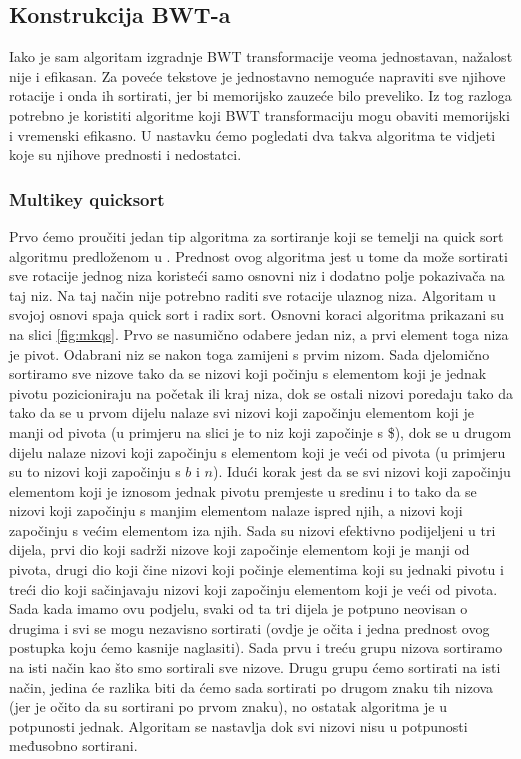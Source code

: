 \subsection{Konstrukcija BWT-a}
Iako je sam algoritam izgradnje BWT transformacije veoma jednostavan, nažalost nije i efikasan. Za poveće tekstove je jednostavno nemoguće napraviti sve njihove rotacije i onda ih sortirati, jer bi memorijsko zauzeće bilo preveliko. Iz tog razloga potrebno je koristiti algoritme koji BWT transformaciju mogu obaviti memorijski i vremenski efikasno. U nastavku ćemo pogledati dva takva algoritma te vidjeti koje su njihove prednosti i nedostatci.

\subsubsection{Multikey quicksort}
Prvo ćemo proučiti jedan tip algoritma za sortiranje koji se temelji na quick sort algoritmu predloženom u \cite{mkqs}. Prednost ovog algoritma jest u tome da može sortirati sve rotacije jednog niza koristeći samo osnovni niz i dodatno polje pokazivača na taj niz. Na taj način nije potrebno raditi sve rotacije ulaznog niza. Algoritam u svojoj osnovi spaja quick sort i radix sort. Osnovni koraci algoritma prikazani su na slici \ref{fig:mkqs}. Prvo se nasumično odabere jedan niz, a prvi element toga niza je pivot. Odabrani niz se nakon toga zamijeni s prvim nizom. Sada djelomično sortiramo sve nizove tako da se nizovi koji počinju s elementom koji je jednak pivotu pozicioniraju na početak ili kraj niza, dok se ostali nizovi poredaju tako da tako da se u prvom dijelu nalaze svi nizovi koji započinju elementom koji je manji od pivota (u primjeru na slici je to niz koji započinje s \$), dok se u drugom dijelu nalaze nizovi koji započinju s elementom koji je veći od pivota (u primjeru su to nizovi koji započinju s $b$ i $n$). Idući korak jest da se svi nizovi koji započinju elementom koji je iznosom jednak pivotu premjeste u sredinu i to tako da se nizovi koji započinju s manjim elementom nalaze ispred njih, a nizovi koji započinju s većim elementom iza njih.  Sada su nizovi efektivno podijeljeni u tri dijela, prvi dio koji sadrži nizove koji započinje elementom koji je manji od pivota, drugi dio koji čine nizovi koji počinje elementima koji su jednaki pivotu i treći dio koji sačinjavaju nizovi  koji započinju elementom koji je veći od pivota. Sada kada imamo ovu podjelu, svaki od ta tri dijela je potpuno neovisan o drugima i svi se mogu nezavisno sortirati (ovdje je očita i jedna prednost ovog postupka koju ćemo kasnije naglasiti). Sada prvu i treću grupu nizova sortiramo na isti način kao što smo sortirali sve nizove. Drugu grupu ćemo sortirati na isti način, jedina će razlika biti da ćemo sada sortirati po drugom znaku tih nizova (jer je očito da su sortirani po prvom znaku), no ostatak algoritma je u potpunosti jednak. Algoritam se nastavlja dok svi nizovi nisu u potpunosti međusobno sortirani.


